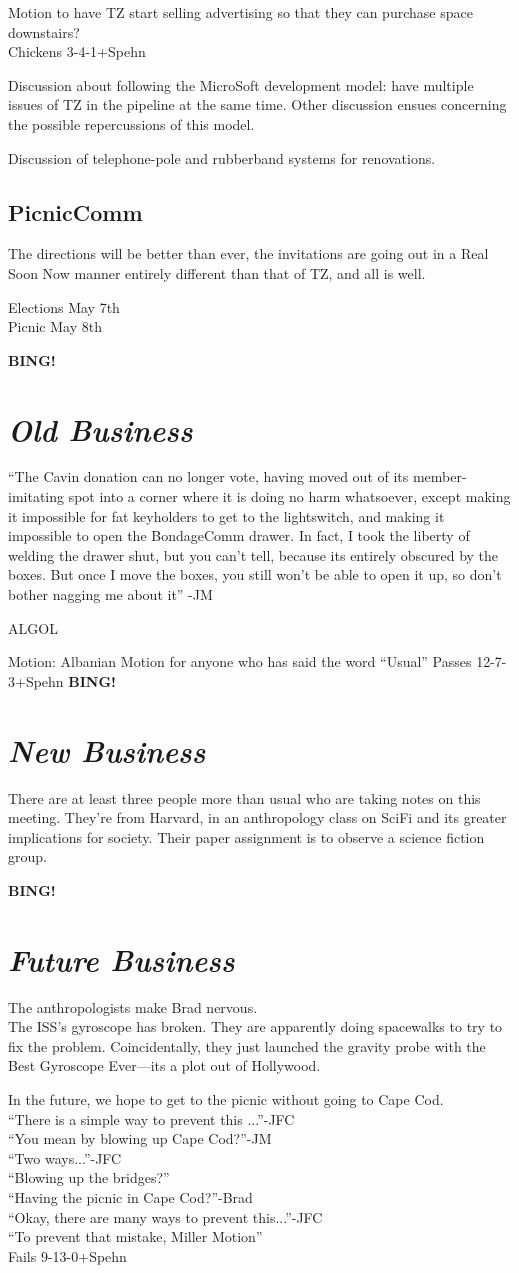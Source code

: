 \documentclass[10pt]{article}
\newcommand{\bing}{{\bf BING!} }
\newcommand{\goto}[1]{\bing \vskip 12pt \section*{{\em{#1}}}}
\begin{document}
Motion to have TZ start selling advertising so that they can purchase
space downstairs?\\
Chickens 3-4-1+Spehn

Discussion about following the MicroSoft development model: have
multiple issues of TZ in the pipeline at the same time.  Other
discussion ensues concerning the possible repercussions of this model.

Discussion of telephone-pole and rubberband systems for renovations.

\subsection*{PicnicComm}
The directions will be better than ever, the invitations are going out
in a Real Soon Now manner entirely different than that of TZ, and all
is well. 

Elections May 7th\\
Picnic May 8th

\goto{Old Business}
``The Cavin donation can no longer vote, having moved out of its
member-imitating spot into a corner where it is doing no harm
whatsoever, except making it impossible for fat keyholders to get to
the lightswitch, and making it impossible to open the BondageComm
drawer. In fact, I took the liberty of welding the drawer shut, but
you can't tell, because its entirely obscured by the boxes.
But once I move the boxes, you still won't be able to open it up, so
don't bother nagging me about it'' -JM

ALGOL

Motion: Albanian Motion for anyone who has said the word ``Usual''
Passes 12-7-3+Spehn
\goto{New Business}

There are at least three people more than usual who are taking notes
on this meeting.  They're from Harvard, in an anthropology class on
SciFi and its greater implications for society.  Their paper
assignment is to observe a science fiction group.

\goto{Future Business}
The anthropologists make Brad nervous.\\
The ISS's gyroscope has broken. They are apparently doing spacewalks
to try to fix the problem. Coincidentally, they just launched the
gravity probe with the Best Gyroscope Ever---its a plot out of Hollywood.

In the future, we hope to get to the picnic without going to Cape Cod.\\
``There is a simple way to prevent this ...''-JFC\\
``You mean by blowing up Cape Cod?''-JM\\
``Two ways...''-JFC\\
``Blowing up the bridges?''\\
``Having the picnic in Cape Cod?''-Brad\\
``Okay, there are many ways to prevent this...''-JFC\\
``To prevent that mistake, Miller Motion''\\
Fails 9-13-0+Spehn
\end{document}
